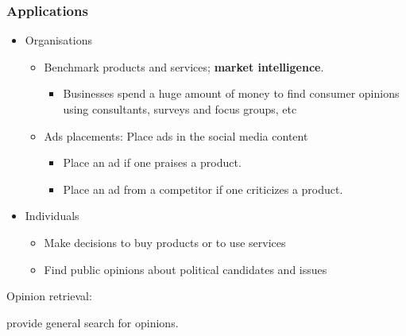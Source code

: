\documentclass[t]{beamer}
\begin{document}
\begin{frame} \frametitle{Applications} %


\begin{itemize}
\item Organisations
\begin{itemize}
\item Benchmark products and services; \textbf{market intelligence}.
  \begin{itemize}
    \item Businesses spend a huge amount of money to find consumer opinions using consultants, surveys and focus groups, etc
  \end{itemize}

\item Ads placements: Place ads in the social media content
  \begin{itemize}
    \item Place an ad if one praises a product. 
    \item Place an ad from a competitor if one criticizes a product.
  \end{itemize}

\end{itemize}

\item Individuals
\begin{itemize}
\item Make decisions to buy products or to use services 
\item Find public opinions about political candidates and issues
\end{itemize}

\end{itemize}

\vfill

\begin{block}{Opinion retrieval:} 

provide general search for opinions.

\end{block}

\end{frame} 

\end{document}
